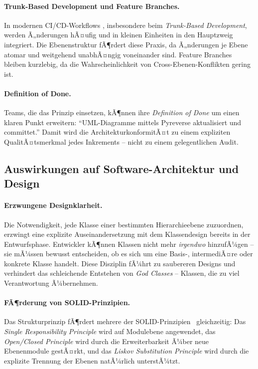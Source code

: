 ﻿\documentclass[a4paper,12pt]{article}
\begin{document}
\paragraph{Trunk-Based Development und Feature Branches.}
In modernen CI/CD-Workflows \cite{humble2010}, insbesondere beim
\textit{Trunk-Based Development}, werden Ã„nderungen hÃ¤ufig und in kleinen
Einheiten in den Hauptzweig integriert. Die Ebenenstruktur fÃ¶rdert diese Praxis,
da Ã„nderungen je Ebene atomar und weitgehend unabhÃ¤ngig voneinander sind. Feature
Branches bleiben kurzlebig, da die Wahrscheinlichkeit von Cross-Ebenen-Konflikten
gering ist.

\paragraph{Definition of Done.}
Teams, die das Prinzip einsetzen, kÃ¶nnen ihre \textit{Definition of Done} um
einen klaren Punkt erweitern: \enquote{UML-Diagramme mittels Pyreverse aktualisiert
	und committet.} Damit wird die ArchitekturkonformitÃ¤t zu einem expliziten
QualitÃ¤tsmerkmal jedes Inkrements -- nicht zu einem gelegentlichen Audit.

\subsection{Auswirkungen auf Software-Architektur und Design}

\paragraph{Erzwungene Designklarheit.}
Die Notwendigkeit, jede Klasse einer bestimmten Hierarchieebene zuzuordnen,
erzwingt eine explizite Auseinandersetzung mit dem Klassendesign bereits in der
Entwurfsphase. Entwickler kÃ¶nnen Klassen nicht mehr \textit{irgendwo}
hinzufÃ¼gen -- sie mÃ¼ssen bewusst entscheiden, ob es sich um eine Basis-,
intermediÃ¤re oder konkrete Klasse handelt. Diese Disziplin fÃ¼hrt zu saubereren
Designs und verhindert das schleichende Entstehen von \textit{God Classes}
\cite{riel1996} -- Klassen, die zu viel Verantwortung Ã¼bernehmen.

\paragraph{FÃ¶rderung von SOLID-Prinzipien.}
Das Strukturprinzip fÃ¶rdert mehrere der SOLID-Prinzipien~\cite{martin2017}
gleichzeitig: Das \textit{Single Responsibility Principle} wird auf Modulebene
angewendet, das \textit{Open/Closed Principle} wird durch die Erweiterbarkeit
Ã¼ber neue Ebenenmodule gestÃ¤rkt, und das \textit{Liskov Substitution Principle}
wird durch die explizite Trennung der Ebenen natÃ¼rlich unterstÃ¼tzt.
\end{document}
